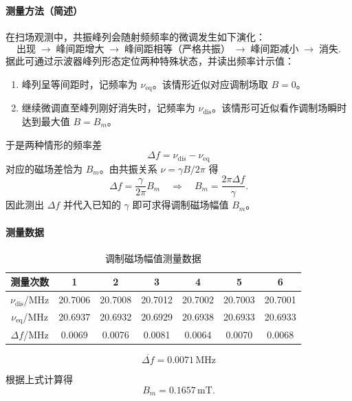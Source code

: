 \documentclass[12pt,a4paper]{article}
\begin{document}
\paragraph{测量方法（简述）}
在扫场观测中，共振峰列会随射频频率的微调发生如下演化：
\[
\text{出现}\;\rightarrow\;\text{峰间距增大}\;\rightarrow\;\text{峰间距相等（严格共振）}\;\rightarrow\;\text{峰间距减小}\;\rightarrow\;\text{消失}.
\]
据此可通过示波器峰列形态定位两种特殊状态，并读出频率计示值：
\begin{enumerate}
    \item 峰列呈等间距时，记频率为 $\nu_{\mathrm{eq}}$。该情形近似对应调制场取 $B=0$。
    \item 继续微调直至峰列刚好消失时，记频率为 $\nu_{\mathrm{dis}}$。该情形可近似看作调制场瞬时达到最大值 $B=B_m$。
\end{enumerate}
于是两种情形的频率差
\[
\Delta f = \nu_{\mathrm{dis}}-\nu_{\mathrm{eq}}
\]
对应的磁场差恰为 $B_m$。由共振关系 $\nu=\gamma B/2\pi$ 得
\[
\Delta f = \frac{\gamma}{2\pi} B_m \quad\Longrightarrow\quad B_m = \frac{2\pi\Delta f}{\gamma}.
\]
因此测出 $\Delta f$ 并代入已知的 $\gamma$ 即可求得调制磁场幅值 $B_m$。

\paragraph{测量数据}
\begin{table}[htbp]
\centering
\caption{调制磁场幅值测量数据}
\begin{tabular}{ccccccc}
\toprule
测量次数 & 1 & 2 & 3 & 4 & 5 & 6 \\
\midrule
$\nu_{\mathrm{dis}}$/MHz & 20.7006 & 20.7008 & 20.7012 & 20.7002 & 20.7003 & 20.7001 \\
$\nu_{\mathrm{eq}}$/MHz & 20.6937 & 20.6932 & 20.6929 & 20.6938 & 20.6933 & 20.6933 \\
$\Delta f$/MHz & 0.0069 & 0.0076 & 0.0081 & 0.0064 & 0.0070 & 0.0068 \\
\bottomrule
\end{tabular}
\end{table}

\[
\overline{\Delta f} = 0.0071\,\mathrm{MHz}
\]

根据上式计算得
\[
B_m = 0.1657\,\mathrm{mT}.
\]
\end{document}
